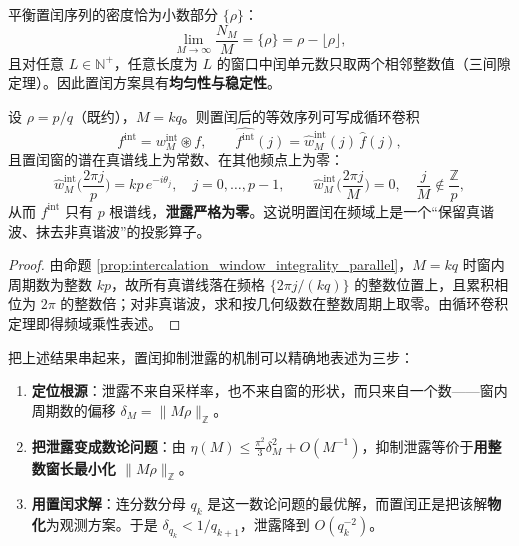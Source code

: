 \begin{property}[置闰密度与三间隙性]\label{prop:intercalation_density_property}
平衡置闰序列的密度恰为小数部分 $\{\rho\}$：
\[
\lim_{M\to\infty}\frac{N_M}{M}=\{\rho\}=\rho-\lfloor\rho\rfloor,
\]
且对任意 $L\in\mathbb{N}^+$，任意长度为 $L$ 的窗口中闰单元数只取两个相邻整数值（三间隙定理）。因此置闰方案具有\textbf{均匀性与稳定性}。
\end{property}

\begin{theorem}[置闰窗的循环卷积实现]\label{thm:intercalation_circular_convolution}
设 $\rho=p/q$（既约），$M=kq$。则置闰后的等效序列可写成循环卷积
\[
f^{\mathrm{int}}=w^{\mathrm{int}}_M\circledast f,
\qquad
\widehat{f^{\mathrm{int}}}(j)=\hat w^{\mathrm{int}}_M(j)\,\hat f(j),
\]
且置闰窗的谱在真谱线上为常数、在其他频点上为零：
\[
\hat w^{\mathrm{int}}_M\Big(\frac{2\pi j}{p}\Big)=kp\,e^{-i\theta_j},\quad j=0,\dots,p-1,
\qquad
\hat w^{\mathrm{int}}_M\Big(\frac{2\pi j}{M}\Big)=0,\quad \frac{j}{M}\notin\frac{\mathbb{Z}}{p},
\]
从而 $f^{\mathrm{int}}$ 只有 $p$ 根谱线，\textbf{泄露严格为零}。这说明置闰在频域上是一个“保留真谐波、抹去非真谐波”的投影算子。
\end{theorem}

\begin{proof}
由命题 \ref{prop:intercalation_window_integrality_parallel}，$M=kq$ 时窗内周期数为整数 $kp$，故所有真谱线落在频格 $\{2\pi j/(kq)\}$ 的整数位置上，且累积相位为 $2\pi$ 的整数倍；对非真谐波，求和按几何级数在整数周期上取零。由循环卷积定理即得频域乘性表述。
\end{proof}

\begin{remark}\label{rem:leakage_intercalation_mechanism}
把上述结果串起来，置闰抑制泄露的机制可以精确地表述为三步：
\begin{enumerate}[label=(\roman*)]
    \item \textbf{定位根源}：泄露不来自采样率，也不来自窗的形状，而只来自一个数——窗内周期数的偏移 $\delta_M=\|M\rho\|_{\mathbb{Z}}$。
    \item \textbf{把泄露变成数论问题}：由 $\eta(M)\le\frac{\pi^2}{3}\delta_M^2+O(M^{-1})$，抑制泄露等价于\textbf{用整数窗长最小化 $\|M\rho\|_{\mathbb{Z}}$}。
    \item \textbf{用置闰求解}：连分数分母 $q_k$ 是这一数论问题的最优解，而置闰正是把该解\textbf{物化}为观测方案。于是 $\delta_{q_k}<1/q_{k+1}$，泄露降到 $O(q_k^{-2})$。
\end{enumerate}
\end{remark}

